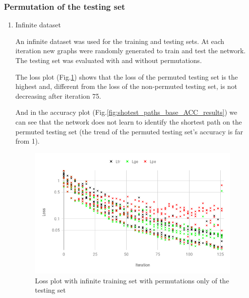 \subsubsection {Permutation of the testing set}
    \begin{enumerate}[label=(\Alph*)]

        \item Infinite dataset
        \label{sec:infinite_test_only}
        
        An infinite dataset was used for the training and testing sets. At each iteration new graphs were randomly generated to train and test the network. The testing set was evaluated with and without permutations.
        
        The loss plot (Fig.\ref{fig:shotest_paths_base_results}) shows that the loss of the permuted testing set is the highest and, different from the loss of the non-permuted testing set, is not decreasing after iteration 75.
        
        And in the accuracy plot (Fig.\ref{fig:shotest_paths_base_ACC_results}) we can see that the network does not learn to identify the shortest path on the permuted testing set (the trend of the permuted testing set's accuracy is far from 1).
        
        \begin{figure}[H]
            \centering
            \includegraphics[width=.9\linewidth]{fig/content/results/shortest_path/base.png}
            \caption{Loss plot with infinite training set with permutations only of the testing set}
            \label{fig:shotest_paths_base_results}
        \end{figure}
        

\end{enumerate}
